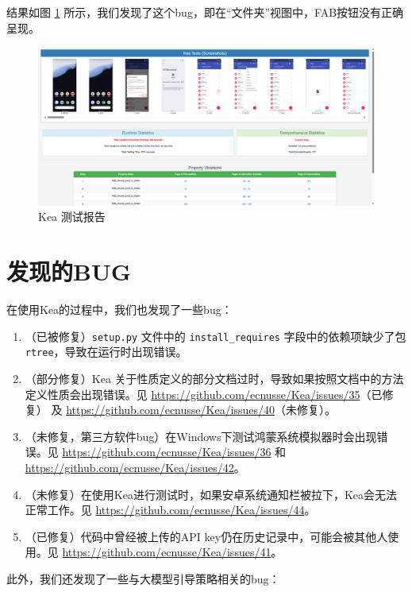 \documentclass{article}
\begin{document}
结果如图 \ref{fig:2} 所示，我们发现了这个bug，即在``文件夹''视图中，FAB按钮没有正确呈现。

\begin{figure}[H]
\centering
\includegraphics[width=\textwidth]{img/2.png}
\caption{Kea 测试报告}
\label{fig:2}
\end{figure}


\section{发现的BUG}

在使用Kea的过程中，我们也发现了一些bug：

\begin{enumerate}
    \item （已被修复）\texttt{setup.py} 文件中的 \texttt{install\_requires} 字段中的依赖项缺少了包 \texttt{rtree}，导致在运行时出现错误。
    \item （部分修复）Kea 关于性质定义的部分文档过时，导致如果按照文档中的方法定义性质会出现错误。见 \url{https://github.com/ecnusse/Kea/issues/35}（已修复） 及 \url{https://github.com/ecnusse/Kea/issues/40}（未修复）。
    \item （未修复，第三方软件bug）在Windows下测试鸿蒙系统模拟器时会出现错误。见 \url{https://github.com/ecnusse/Kea/issues/36} 和 \url{https://github.com/ecnusse/Kea/issues/42}。
    \item （未修复）在使用Kea进行测试时，如果安卓系统通知栏被拉下，Kea会无法正常工作。见 \url{https://github.com/ecnusse/Kea/issues/44}。
    \item （已修复）代码中曾经被上传的API key仍在历史记录中，可能会被其他人使用。见 \url{https://github.com/ecnusse/Kea/issues/41}。
\end{enumerate}

此外，我们还发现了一些与大模型引导策略相关的bug：
\end{document}
